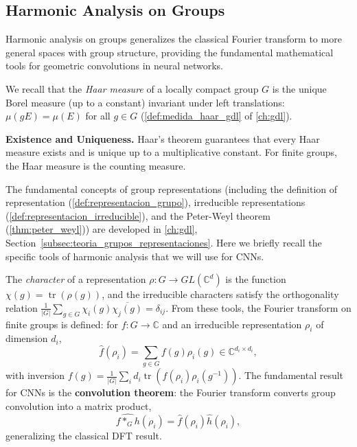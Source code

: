 \subsection{Harmonic Analysis on Groups}\label{subsec:analisis_armonico_grupos}

Harmonic analysis on groups generalizes the classical Fourier transform to more general spaces with group structure, providing the fundamental mathematical tools for geometric convolutions in neural networks.

We recall that the \textit{Haar measure} of a locally compact group $G$ is the unique Borel measure (up to a constant) invariant under left translations: $\mu(gE) = \mu(E)$ for all $g \in G$ (\autoref{def:medida_haar_gdl} of \autoref{ch:gdl}).\label{def:medida_haar}

\textbf{Existence and Uniqueness.} Haar's theorem guarantees that every Haar measure exists and is unique up to a multiplicative constant. For finite groups, the Haar measure is the counting measure.

The fundamental concepts of group representations (including the definition of representation (\autoref{def:representacion_grupo}), irreducible representations (\autoref{def:representacion_irreducible}), and the Peter-Weyl theorem (\autoref{thm:peter_weyl})) are developed in \autoref{ch:gdl}, Section~\ref{subsec:teoria_grupos_representaciones}. Here we briefly recall the specific tools of harmonic analysis that we will use for CNNs.

The \textit{character} of a representation $\rho: G \to GL(\mathbb{C}^d)$ is the function $\chi(g) = \operatorname{tr}(\rho(g))$, and the irreducible characters satisfy the orthogonality relation $\frac{1}{|G|} \sum_{g \in G} \chi_i(g) \overline{\chi_j(g)} = \delta_{ij}$. From these tools, the Fourier transform on finite groups is defined: for $f: G \to \mathbb{C}$ and an irreducible representation $\rho_i$ of dimension $d_i$,
\begin{equation}\label{eq:fourier_grupo_finito}
\hat{f}(\rho_i) = \sum_{g\in G} f(g)\rho_i(g) \in \mathbb{C}^{d_i \times d_i},
\end{equation}
with inversion $f(g) = \frac{1}{|G|} \sum_i d_i \operatorname{tr}(\hat{f}(\rho_i) \rho_i(g^{-1}))$. The fundamental result for CNNs is the \textbf{convolution theorem}: the Fourier transform converts group convolution into a matrix product,
\begin{equation}\label{eq:convolucion_fourier_grupos}
\widehat{f *_G h}(\rho_i) = \hat{f}(\rho_i) \hat{h}(\rho_i),
\end{equation}
generalizing the classical DFT result.

